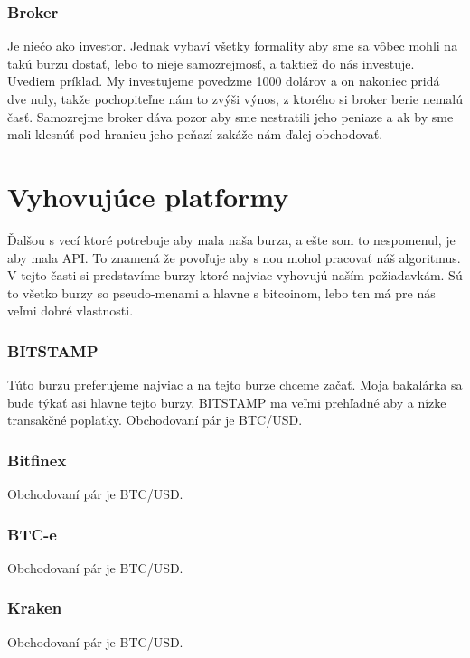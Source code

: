 \subsubsection{Broker}
Je niečo ako investor. Jednak vybaví všetky formality aby sme sa vôbec mohli na takú burzu dostať, lebo to nieje samozrejmosť, a taktiež do nás investuje. Uvediem príklad. My investujeme povedzme 1000 dolárov a on nakoniec pridá dve nuly, takže pochopiteľne nám to zvýši výnos, z ktorého si broker berie nemalú časť. Samozrejme broker dáva pozor aby sme nestratili jeho peniaze a ak by sme mali klesnúť pod hranicu jeho peňazí zakáže nám ďalej obchodovať.\cite{ZAC} 
\section{Vyhovujúce platformy} 
Ďalšou s vecí ktoré potrebuje aby mala naša burza, a ešte som to nespomenul, je aby mala API. To znamená že povoľuje aby s nou mohol pracovať náš algoritmus. V tejto časti si predstavíme burzy ktoré najviac vyhovujú naším požiadavkám. Sú to všetko burzy so pseudo-menami a hlavne s bitcoinom, lebo ten má pre nás veľmi dobré vlastnosti.
\subsubsection{BITSTAMP}
Túto burzu preferujeme najviac a na tejto burze chceme začať. Moja bakalárka sa bude týkať asi hlavne tejto burzy. BITSTAMP ma veľmi prehľadné aby a nízke transakčné poplatky. Obchodovaní pár je BTC/USD. \cite{Bit}
\subsubsection{Bitfinex}
Obchodovaní pár je BTC/USD. \cite{Bitf}
\subsubsection{BTC-e}
Obchodovaní pár je BTC/USD. \cite{BTC}
\subsubsection{Kraken}
Obchodovaní pár je BTC/USD. \cite{Kre}

